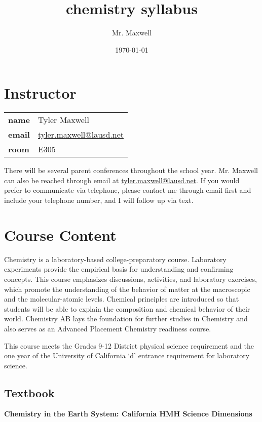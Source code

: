 \documentclass[11pt]{article}
\author{Mr. Maxwell}
\date{\today}
\title{chemistry syllabus}
\begin{document}
\section{Instructor}
\label{sec:org543ab52}

\begin{center}
\begin{tabular}{ll}
\textbf{\textbf{name}} & Tyler Maxwell\\[0pt]
\textbf{\textbf{email}} & \href{mailto:tyler.maxwell@lausd.net}{tyler.maxwell@lausd.net}\\[0pt]
\textbf{\textbf{room}} & E305\\[0pt]
\end{tabular}
\end{center}

There will be several parent conferences throughout the school year. Mr. Maxwell can also be reached through email at \href{mailto:tyler.maxwell@lausd.net}{tyler.maxwell@lausd.net}. If you would prefer to communicate via telephone, please contact me through email first and include your telephone number, and I will follow up via text.

\section{Course Content}
\label{sec:orgb9c1646}

Chemistry is a laboratory-based college-preparatory course. Laboratory experiments provide the empirical basis for understanding and confirming concepts. This course emphasizes discussions, activities, and laboratory exercises, which promote the understanding of the behavior of matter at the macroscopic and the molecular-atomic levels. Chemical principles are introduced so that students will be able to explain the composition and chemical behavior of their world. Chemistry AB lays the foundation for further studies in Chemistry and also serves as an Advanced Placement Chemistry readiness course.

This course meets the Grades 9-12 District physical science requirement and the one year of the University of California ‘d’ entrance requirement for laboratory science.

\subsection{Textbook}
\label{sec:org7e72387}

\textbf{\textbf{Chemistry in the Earth System: California HMH Science Dimensions}}
\end{document}

